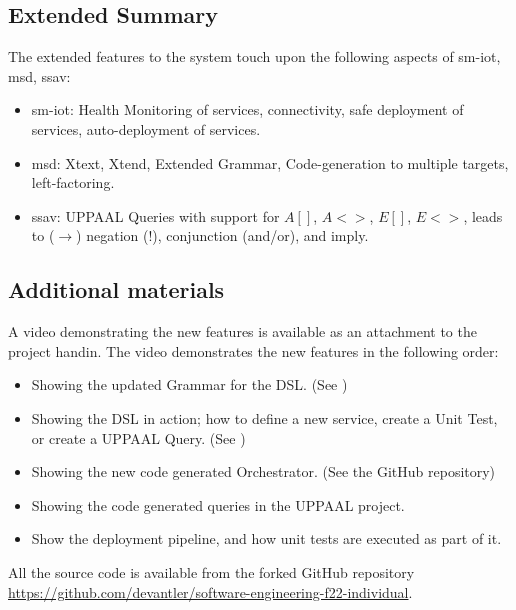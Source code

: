 \subsection*{Extended Summary}

The extended features to the system touch upon the following aspects of \acrshort{sm-iot}, \acrshort{msd}, \acrshort{ssav}:

\begin{itemize}[leftmargin=*]
    \item \acrshort{sm-iot}: Health Monitoring of services, connectivity, safe deployment of services, auto-deployment of services.
    \item \acrshort{msd}: Xtext, Xtend, Extended Grammar, Code-generation to multiple targets, left-factoring.  
    \item \acrshort{ssav}: UPPAAL Queries with support for $A[]$, $A<>$, $E[]$, $E<>$, leads to ($\rightarrow$) negation ($!$), conjunction (and/or), and imply.
\end{itemize}

\subsection*{Additional materials}

A video demonstrating the new features is available as an attachment to the project handin. The video demonstrates the new features in the following order:

\begin{itemize}[leftmargin=*]
    \item Showing the updated Grammar for the DSL. (See )
    \item Showing the DSL in action; how to define a new service, create a Unit Test, or create a UPPAAL Query. (See )
    \item Showing the new code generated Orchestrator. (See the GitHub repository)
    \item Showing the code generated queries in the UPPAAL project.
    \item Show the deployment pipeline, and how  unit tests are executed as part of it.
\end{itemize}

All the source code is available from the forked GitHub repository \href{https://github.com/devantler/software-engineering-f22-individual}{https://github.com/devantler/software-engineering-f22-individual}.
